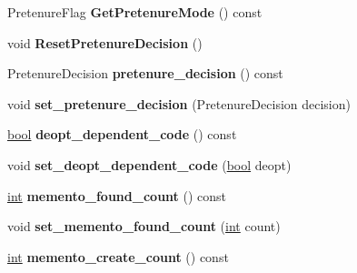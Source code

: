 \begin{DoxyCompactItemize}
Pretenure\+Flag {\bfseries Get\+Pretenure\+Mode} () const
\item 
\mbox{\label{classv8_1_1internal_1_1AllocationSite_aa1b323951edb619dd9078164b9fabd5c}} 
void {\bfseries Reset\+Pretenure\+Decision} ()
\item 
\mbox{\label{classv8_1_1internal_1_1AllocationSite_a39fc1c0543c261ff4735a551113664d5}} 
Pretenure\+Decision {\bfseries pretenure\+\_\+decision} () const
\item 
\mbox{\label{classv8_1_1internal_1_1AllocationSite_a3eb7bfb649894bc1ea0875152aff118e}} 
void {\bfseries set\+\_\+pretenure\+\_\+decision} (Pretenure\+Decision decision)
\item 
\mbox{\label{classv8_1_1internal_1_1AllocationSite_a5d2bc5f9c30628481e1f179b18818690}} 
\mbox{\hyperlink{classbool}{bool}} {\bfseries deopt\+\_\+dependent\+\_\+code} () const
\item 
\mbox{\label{classv8_1_1internal_1_1AllocationSite_a6b6321178dbb71e389194b39a6ee51ee}} 
void {\bfseries set\+\_\+deopt\+\_\+dependent\+\_\+code} (\mbox{\hyperlink{classbool}{bool}} deopt)
\item 
\mbox{\label{classv8_1_1internal_1_1AllocationSite_a7db228ca1d6bd89aa2af33005ca7a35e}} 
\mbox{\hyperlink{classint}{int}} {\bfseries memento\+\_\+found\+\_\+count} () const
\item 
\mbox{\label{classv8_1_1internal_1_1AllocationSite_ad74c42dccc41adcc6d7f2dd22fa56176}} 
void {\bfseries set\+\_\+memento\+\_\+found\+\_\+count} (\mbox{\hyperlink{classint}{int}} count)
\item 
\mbox{\label{classv8_1_1internal_1_1AllocationSite_aa67ceb7ab03404c0e31fa529f08520c0}} 
\mbox{\hyperlink{classint}{int}} {\bfseries memento\+\_\+create\+\_\+count} () const
\item 
\mbox{\label{classv8_1_1internal_1_1AllocationSite_ab95f8e888faad709405944f3f5223378}} 

\end{DoxyCompactItemize}
